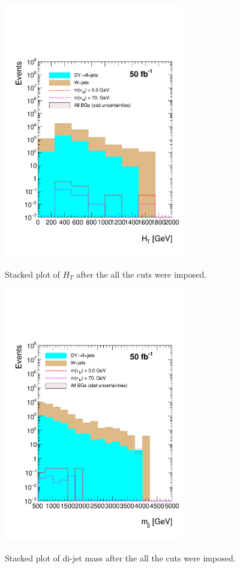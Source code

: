  
 \begin{figure}[h] 
 \centering
 \caption{Stacked plot of $H_T$ after the all the cuts were imposed.}
 \includegraphics[width=0.7\textwidth]{./Capitulos/Analysis/AfterVBFCUTS/HT_MET_20} 
 \label{HT_VBF}
 \end{figure} 
 
  \begin{figure}[h] 
 \centering
 \caption{Stacked plot of di-jet mass after the all the cuts were imposed.}
 \includegraphics[width=0.7\textwidth]{./Capitulos/Analysis/AfterVBFCUTS/mjj_MET_20} 
 \label{diJetMass_VBF}
 \end{figure} 
 
